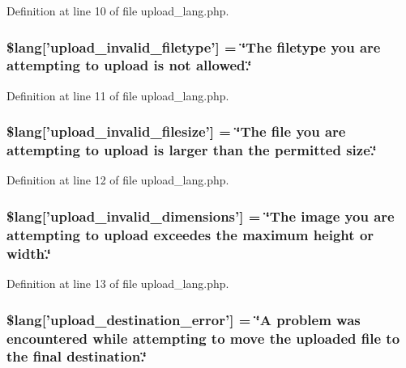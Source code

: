 Definition at line 10 of file upload\-\_\-lang.\-php.

\hypertarget{upload__lang_8php_ac8631aa85ed80396bd78e91a76d5fd38}{
\subsubsection[{\$lang}]{\setlength{\rightskip}{0pt plus 5cm}\$lang\mbox{[}'upload\-\_\-invalid\-\_\-filetype'\mbox{]} = \char`\"{}The filetype you are attempting {\bf to} upload is {\bf not} allowed.\char`\"{}}}\label{upload__lang_8php_ac8631aa85ed80396bd78e91a76d5fd38}


Definition at line 11 of file upload\-\_\-lang.\-php.

\hypertarget{upload__lang_8php_a832b3ec1d84b1d48a488cf525954d8f2}{
\subsubsection[{\$lang}]{\setlength{\rightskip}{0pt plus 5cm}\$lang\mbox{[}'upload\-\_\-invalid\-\_\-filesize'\mbox{]} = \char`\"{}The file you are attempting {\bf to} upload is larger than the permitted size.\char`\"{}}}\label{upload__lang_8php_a832b3ec1d84b1d48a488cf525954d8f2}


Definition at line 12 of file upload\-\_\-lang.\-php.

\hypertarget{upload__lang_8php_a4e796eeccf7df90acffea7884a5bd558}{
\subsubsection[{\$lang}]{\setlength{\rightskip}{0pt plus 5cm}\$lang\mbox{[}'upload\-\_\-invalid\-\_\-dimensions'\mbox{]} = \char`\"{}The image you are attempting {\bf to} upload exceedes the maximum height {\bf or} width.\char`\"{}}}\label{upload__lang_8php_a4e796eeccf7df90acffea7884a5bd558}


Definition at line 13 of file upload\-\_\-lang.\-php.

\hypertarget{upload__lang_8php_a31be70c748b9bfc43dd7468e1fa64c42}{
\subsubsection[{\$lang}]{\setlength{\rightskip}{0pt plus 5cm}\$lang\mbox{[}'upload\-\_\-destination\-\_\-error'\mbox{]} = \char`\"{}A problem was encountered while attempting {\bf to} move the uploaded file {\bf to} the final destination.\char`\"{}}}\label{upload__lang_8php_a31be70c748b9bfc43dd7468e1fa64c42}


